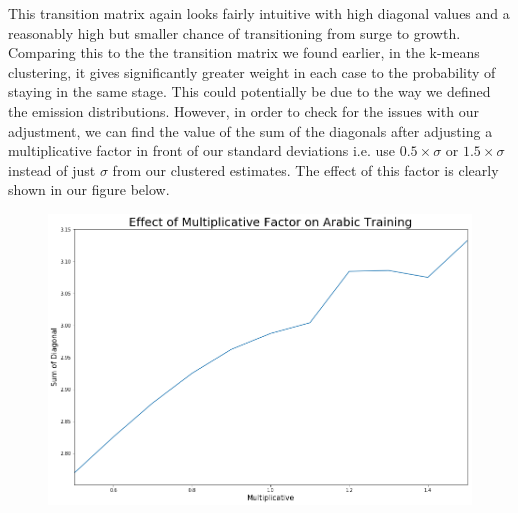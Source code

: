 \documentclass[12pt]{article}
\begin{document}
\vspace{0.5cm}
This transition matrix again looks fairly intuitive with high diagonal values and a reasonably high but smaller chance of transitioning from surge to growth.
Comparing this to the the transition matrix we found earlier, in the k-means clustering, it gives significantly greater weight in each case to the probability of staying in the same stage. This could potentially be due to the way we defined the emission distributions. However, in order to check for the issues with our adjustment, we can find the value of the sum of the diagonals after adjusting a multiplicative factor in front of our standard deviations i.e. use $0.5 \times \sigma$ or $1.5 \times \sigma$ instead of just $\sigma$ from our clustered estimates. The effect of this factor is clearly shown in our figure below.
\FloatBarrier
\begin{figure}[hbtp]\centering
\includegraphics[width=\textwidth,clip]{images/MultiplicativeFactor.png}
\end{figure}
\FloatBarrier
\end{document}
